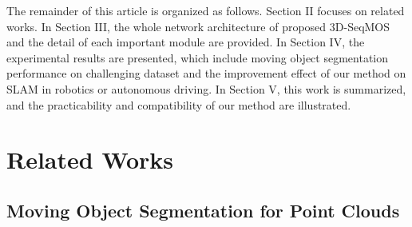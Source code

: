 \documentclass[lettersize,journal]{IEEEtran}
\begin{document}
The remainder of this article is organized as follows. Section II focuses on related works. In Section III, the whole network architecture of proposed 3D-SeqMOS and the detail of each important module are provided. In Section IV, the experimental results are presented, which include moving object segmentation performance on challenging dataset and the improvement effect of our method on SLAM in robotics or autonomous driving. In Section V, this work is summarized, and the practicability and compatibility of our method are illustrated.


\section{Related Works}

\subsection{Moving Object Segmentation for Point Clouds}
\end{document}
